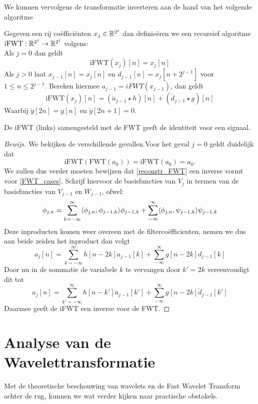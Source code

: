 We kunnen vervolgens de transformatie inverteren aan de hand van het volgende algoritme
\begin{algo}
  Gegeven een rij co\"effici\"enten $x_j\in\mathbb{R}^{2^j}$ dan definie\"eren we een recursief
  algoritme $\mathrm{iFWT}:\mathbb{R}^{2^j}\to\mathbb{R}^{2^j}$ volgens:\\
  Als $j=0$ dan geldt
  \[
  \mathrm{iFWT}(x_j)[n] = x_j[n]
  \]
  Als $j>0$ laat $x_{j-1}[n] = x_j[n]$ en $d_{j-1}[n] = x_j[n+2^{j-1}]$ voor
  $1\leq n\leq 2^{j-1}$. Bereken hiermee $a_{j-1} = iFWT(x_{j-1})$,
  dan geldt
  \begin{equation}
    \label{reconstr_FWT}
    \mathrm{iFWT}(x_j)[n] = (\breve a_{j-1}\star h)[n] + (\breve d_{j-1}\star g)[n]
  \end{equation}
  Waarbij $\breve y [2n] = y[n]$ en $\breve y [2n+1] = 0$.
\end{algo}
\begin{stelling}
  De iFWT (links) samengesteld met de FWT geeft de identiteit voor een signaal.
\end{stelling}
\begin{proof}[Bewijs]
  We bekijken de verschillende gevallen.Voor het geval $j=0$ geldt duidelijk dat
  \[
  \mathrm{iFWT}(\mathrm{FWT}(a_0)) = \mathrm{iFWT}(a_0) = a_0.
  \]
  We zullen dus verder moeten bewijzen dat \ref{reconstr_FWT} een inverse vormt voor
  \ref{FWT_cases}.
  Schrijf hiervoor de basisfuncties van $V_j$ in termen van de basisfuncties van $V_{j-1}$
  en $W_{j-1}$, ofwel:
  \[
  \phi_{j,n} = \sum_{k=-\infty}^\infty \langle \phi_{j,n} , \phi_{j-1,k} \rangle\phi_{j-1,k}
  + \sum_{-\infty}^\infty \langle \phi_{j,n} , \psi_{j-1,k} \rangle\psi_{j-1,k}
  \]
  Deze inproducten komen weer overeen met de filterco\"efficienten, nemen we dus aan
  beide zeiden het inproduct dan volgt
  \[
  a_j[n] = \sum_{k=-\infty}^\infty h[n-2k]a_{j-1}[k]
  + \sum_{-\infty}^\infty g[n-2k]d_{j-1}[k]
  \]
  Door nu in de sommatie de variabele $k$ te vervangen door $k'=2k$ vereenvoudigt dit tot
  \[
  a_j[n] = \sum_{k'=-\infty}^\infty h[n-k']\breve a_{j-1}[k']
  + \sum_{-\infty}^\infty g[n-2k]\breve d_{j-1}[k']
  \]
  Daarmee geeft de iFWT een inverse voor de FWT.
\end{proof}
\section{Analyse van de Wavelettransformatie}
Met de theoretische beschouwing van wavelets en de Fast Wavelet Transform achter de rug, kunnen we wat verder kijken naar practische obstakels.

